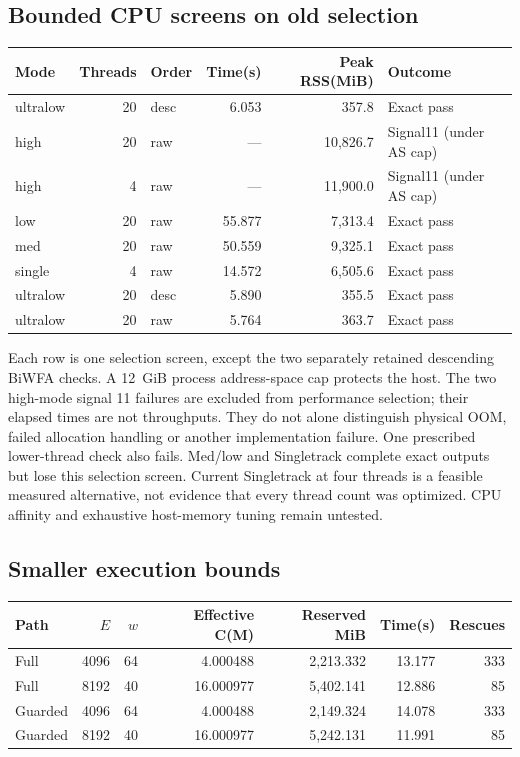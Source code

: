 \documentclass[11pt,a4paper]{article}
\begin{document}
\subsection{Bounded CPU screens on old selection}
\begin{center}\small\begin{tabular}{lrlrrl}\toprule
Mode & Threads & Order & Time(s) & Peak RSS(MiB) & Outcome\\\midrule
ultralow & 20 & desc & 6.053 & 357.8 & Exact pass\\
high & 20 & raw & --- & 10,826.7 & Signal11 (under AS cap)\\
high & 4 & raw & --- & 11,900.0 & Signal11 (under AS cap)\\
low & 20 & raw & 55.877 & 7,313.4 & Exact pass\\
med & 20 & raw & 50.559 & 9,325.1 & Exact pass\\
single & 4 & raw & 14.572 & 6,505.6 & Exact pass\\
ultralow & 20 & desc & 5.890 & 355.5 & Exact pass\\
ultralow & 20 & raw & 5.764 & 363.7 & Exact pass\\
\bottomrule\end{tabular}\end{center}

Each row is one selection screen, except the two separately retained descending BiWFA checks. A 12~GiB process address-space cap protects the host. The two high-mode signal 11 failures are excluded from performance selection; their elapsed times are not throughputs. They do not alone distinguish physical OOM, failed allocation handling or another implementation failure. One prescribed lower-thread check also fails. Med/low and Singletrack complete exact outputs but lose this selection screen. Current Singletrack at four threads is a feasible measured alternative, not evidence that every thread count was optimized. CPU affinity and exhaustive host-memory tuning remain untested.

\subsection{Smaller execution bounds}
\begin{center}\small\begin{tabular}{lrrrrrr}\toprule
Path & $E$ & $w$ & Effective C(M) & Reserved MiB & Time(s) & Rescues\\\midrule
Full & 4096 & 64 & 4.000488 & 2,213.332 & 13.177 & 333\\
Full & 8192 & 40 & 16.000977 & 5,402.141 & 12.886 & 85\\
Guarded & 4096 & 64 & 4.000488 & 2,149.324 & 14.078 & 333\\
Guarded & 8192 & 40 & 16.000977 & 5,242.131 & 11.991 & 85\\
\bottomrule\end{tabular}\end{center}
\end{document}
